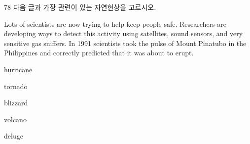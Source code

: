 \begin{question}{78}
다음 글과 가장 관련이 있는 자연현상을 고르시오.
\begin{framedtext}
Lots of scientists are now trying to help keep people safe. Researchers are developing ways to detect this activity using satellites, sound sensors, and very sensitive gas sniffers. In 1991 scientists took the pulse of Mount Pinatubo in the Philippines and correctly predicted that it was about to erupt.
\end{framedtext}
\begin{choices}
  \item hurricane
  \item tornado
  \item blizzard
  \item volcano
  \item deluge
\end{choices}
\end{question}
